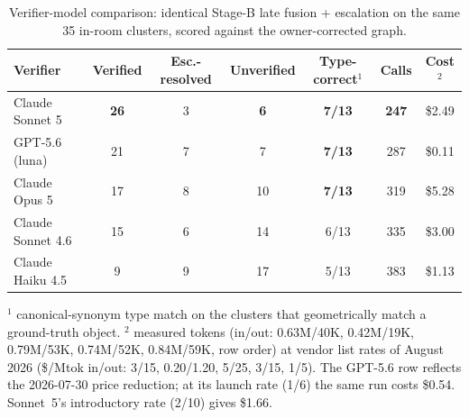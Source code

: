 \begin{table}[t]
\centering
\caption{Verifier-model comparison: identical Stage-B late fusion +
escalation on the same 35 in-room clusters, scored against the
owner-corrected graph.}
\label{tab:vlmcmp}
\small
\begin{tabular}{@{}lcccccc@{}}
\toprule
Verifier & Verified & Esc.-resolved & Unverified &
Type-correct$^{1}$ & Calls & Cost$^{2}$ \\
\midrule
Claude Sonnet 5 & \textbf{26} & 3 & \textbf{6} & \textbf{7/13} &
\textbf{247} & \$2.49 \\
GPT-5.6 (luna) & 21 & 7 & 7 & \textbf{7/13} & 287 & \$0.11 \\
Claude Opus 5 & 17 & 8 & 10 & \textbf{7/13} & 319 & \$5.28 \\
Claude Sonnet 4.6 & 15 & 6 & 14 & 6/13 & 335 & \$3.00 \\
Claude Haiku 4.5 & 9 & 9 & 17 & 5/13 & 383 & \$1.13 \\
\bottomrule
\end{tabular}

{\footnotesize $^{1}$ canonical-synonym type match on the clusters that
geometrically match a ground-truth object. $^{2}$ measured tokens
(in/out: 0.63M/40K, 0.42M/19K, 0.79M/53K, 0.74M/52K, 0.84M/59K, row
order) at vendor list rates of August 2026 (\$/Mtok in/out: 3/15,
0.20/1.20, 5/25, 3/15, 1/5). The GPT-5.6 row reflects the 2026-07-30
price reduction; at its launch rate (1/6) the same run costs \$0.54.
Sonnet~5's introductory rate (2/10) gives \$1.66.}
\end{table}

